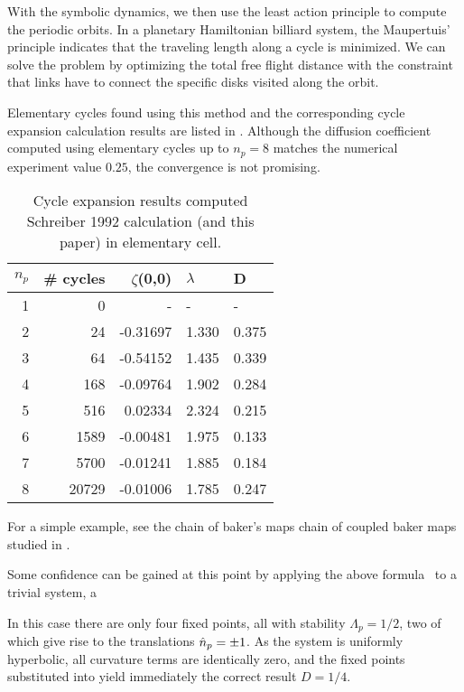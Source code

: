 With the symbolic dynamics, we then use the least action principle to
compute the periodic orbits. In a planetary Hamiltonian
billiard system, the Maupertuis' principle indicates that the traveling
length along a cycle is minimized. We can solve the problem by optimizing
the total free flight distance with the constraint that links have to
connect the specific disks visited along the orbit.

Elementary cycles found using this method and the corresponding cycle
expansion calculation results are listed in . Although the
diffusion coefficient computed using elementary cycles up to $n_p = 8$
matches the numerical experiment value $0.25$, the convergence is not
promising.

\begin{table}[htbp]
\begin{tabular}{|r|r|r|l|l|}
\hline
${n_p}$ & \# cycles & $\zeta$(0,0) & $\lambda$ & D \\ \hline\hline
1      & 0      &   -    &   -  &   - \\
2      & 24     & -0.31697 & 1.330 & 0.375\\
3      & 64     & -0.54152 & 1.435 & 0.339\\
4      & 168    & -0.09764 & 1.902 & 0.284\\
5      & 516    &  0.02334 & 2.324 & 0.215\\
6      & 1589   & -0.00481 & 1.975 & 0.133\\
7      & 5700   & -0.01241 & 1.885 & 0.184\\
8      & 20729  & -0.01006 & 1.785 & 0.247\\ \hline

\end{tabular}
\caption{\label{TCELL1}
Cycle expansion results computed Schreiber 1992 calculation (and
  this paper) in elementary cell.
}
\end{table}

For a simple example, see the chain of baker's maps chain of coupled
baker maps studied in .

Some confidence can be gained at this point by applying the above
formula~ to a trivial system, a

In this case there are only four fixed points, all with
stability $\Lambda_p=1/2$, two of
which give rise to the translations $\hat{n}_{p}=\pm 1$.
As the system is
uniformly hyperbolic, all curvature terms are identically zero,
and the fixed points substituted into  yield
immediately the correct result $D=1/4$.
